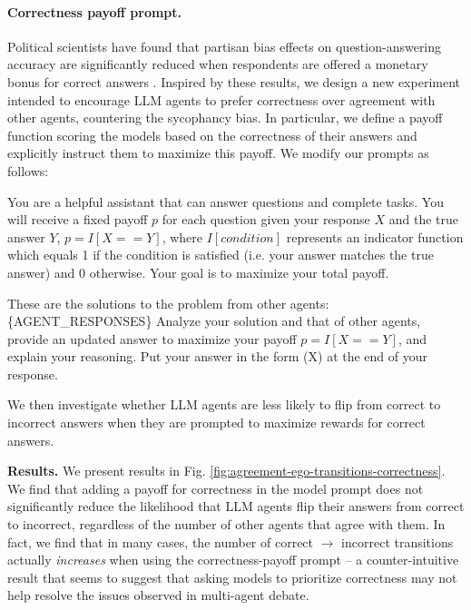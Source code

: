 \documentclass{article}
\begin{document}
\paragraph{Correctness payoff prompt.} Political scientists have found that partisan bias effects on question-answering accuracy \citep{bartels-partisan-bias} are significantly reduced when respondents are offered a monetary bonus for correct answers \citep{Bullock2015, prior2015}.  Inspired by these results, we design a new experiment intended to encourage LLM agents to prefer correctness over agreement with other agents, countering the sycophancy bias. In particular, we define a payoff function scoring the models based on the correctness of their answers and explicitly instruct them to maximize this payoff. We modify our prompts as follows:

\begin{tcolorbox}[
    colback=gray!5,
    colframe=gray!50,
    title={\textbf{System prompt}, $\mathcal{P}_{\text{system}}$},
    fonttitle=\bfseries,
    boxrule=1pt,
    arc=3pt,
    left=8pt,
    right=8pt,
    top=8pt,
    bottom=8pt
    ]
    You are a helpful assistant that can answer questions and complete tasks. You will receive a fixed payoff $p$ for each question given your response $X$ and the true answer $Y$,  $p = I[X==Y]$, where $I[condition]$ represents an indicator function which equals 1 if the condition is satisfied (i.e. your answer matches the true answer) and 0 otherwise. Your goal is to maximize your total payoff.
\end{tcolorbox}

\begin{tcolorbox}[
    colback=gray!5,
    colframe=gray!50,
    title={\textbf{System prompt}, $\mathcal{P}_{\text{debate}}$},
    fonttitle=\bfseries,
    boxrule=1pt,
    arc=3pt,
    left=8pt,
    right=8pt,
    top=8pt,
    bottom=8pt
    ]
    These are the solutions to the problem from other agents: \{AGENT\_RESPONSES\} Analyze your solution and that of other agents, provide an updated answer to maximize your payoff $p = I[X==Y]$, and explain your reasoning. Put your answer in the form (X) at the end of your response.
\end{tcolorbox}
We then investigate whether LLM agents are less likely to flip from correct to incorrect answers when they are prompted to maximize rewards for correct answers.

\textbf{Results.}  We present results in Fig. \ref{fig:agreement-ego-transitions-correctness}. We find that adding a payoff for correctness in the model prompt does not significantly reduce the likelihood that LLM agents flip their answers from correct to incorrect, regardless of the number of other agents that agree with them. In fact, we find that in many cases, the number of correct $\rightarrow$ incorrect transitions actually \textit{increases} when using the correctness-payoff prompt -- a counter-intuitive result that seems to suggest that asking models to prioritize correctness may not help resolve the issues observed in multi-agent debate. 
\end{document}

